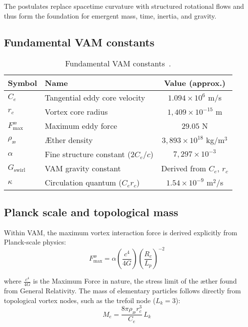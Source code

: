 The postulates replace spacetime curvature with structured rotational flows and thus form the foundation for emergent mass, time, inertia, and gravity.

\subsection*{Fundamental VAM constants}

\begin{table}[htbp]
    \centering
    \begin{tabular}{llc}
        \hline
        \toprule
        \textbf{Symbol} & \textbf{Name} & \textbf{Value (approx.)} \\
        \hline
        \midrule
        $C_e$ & Tangential eddy core velocity & $1.094 \times 10^6$ m/s \\
        $r_c$ & Vortex core radius & $1,409 \times 10^{-15}$ m \\
        $F^{\text{\ae}}_{\text{max}}$ & Maximum eddy force & $29.05$ N \\
        $\rho_\text{\ae}$ & Æther density & $3,893 \times 10^{18}$ kg/m$^3$ \\
        $\alpha$ & Fine structure constant ($2 C_e/c$) & $7,297 \times 10^{-3}$\\
        $G_\text{swirl}$ & VAM gravity constant & Derived from $C_e$, $r_c$\\
        $\kappa$ & Circulation quantum ($C_e r_c$) & $1.54 \times 10^{-9}$ m$^2$/s \\
        \hline
        \bottomrule
    \end{tabular}
    \caption{Fundamental VAM constants~\cite{vam2025field}.}
    \label{tab:VAMconstants}
\end{table}

\subsection*{Planck scale and topological mass}

Within VAM, the maximum vortex interaction force is derived explicitly from Planck-scale physics:
\begin{equation}
    F^{\text{\ae}}_{\text{max}} = \alpha  \left(\frac{c^4}{4G}\right) \left(\frac{R_c}{L_p}\right)^{-2}
\end{equation}

where $\frac{c^4}{4G}$ is the Maximum Force in nature, the stress limit of the æther found from General Relativity.
The mass of elementary particles follows directly from topological vortex nodes, such as the trefoil node ($L_k=3$):
\begin{equation}
    M_e = \frac{8\pi \rho_\text{\ae} r_c^3}{C_e}\, L_k
\end{equation}

